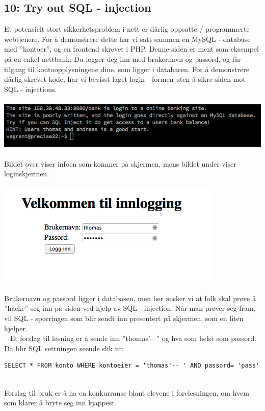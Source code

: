 \documentclass{article}
\begin{document}
\subsection{10: Try out SQL - injection}
Et potensielt stort sikkerhetsproblem i nett er dårlig oppsatte / programmerte webtjenere. For å demonstrere dette har vi satt sammen en MySQL - database med ''kontoer'', og en frontend skrevet i PHP. Denne siden er ment som eksempel på en enkel nettbank: Du logger deg inn med brukernavn og passord, og får tilgang til kontoopplysningene dine, som ligger i databasen. For å demonstrere dårlig skrevet kode, har vi bevisst laget login - formen uten å sikre siden mot SQL - injections. 
\\
\\
\includegraphics[scale = 0.8]{pictures/sqlinject.png}
\\
\\
Bildet over viser infoen som kommer på skjermen, mens bildet under viser loginskjermen.
\\
\\
\includegraphics[scale = 0.7]{pictures/bank.png}
\\
\\
Brukernavn og passord ligger i databasen, men her ønsker vi at folk skal prøve å ''hacke'' seg inn på siden ved hjelp av SQL - injection. 
Når man prøver seg fram, vil SQL - spørringen som blir sendt inn presentert på skjermen, som en liten hjelper. \\ 
Et forslag til løsning er å sende inn ''thomas'-- '' og hva som helst som passord. Da blir SQL settningen seende slik ut: 
\begin{lstlisting}
SELECT * FROM konto WHERE kontoeier = 'thomas'-- ' AND passord= 'pass' 
\end{lstlisting}
\\ 
Forslag til bruk er å ha en konkurranse blant elevene i forelesningen, om hvem som klarer å bryte seg inn kjappest. 
\end{document}
